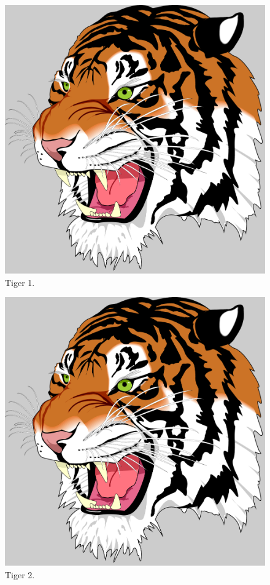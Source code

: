 \documentclass[a4paper,fleqn,12pt]{jreport}
\begin{document}
\begin{multicols}{2}
   	\begin{figure}[H]
   		\begin{center}
   		\includegraphics[width=0.6\columnwidth]{tiger.pdf}
   		\caption{Tiger 1.}
   		\label{fig:abst1}
   		\end{center}
   	\end{figure}

   	\begin{figure}[H]
   		\begin{center}
   		\includegraphics[width=0.6\columnwidth]{tiger.pdf}
   		\caption{Tiger 2.}
   		\label{fig:abst2}
   		\end{center}
   	\end{figure}
\end{multicols}


\clearpage
\end{document}
